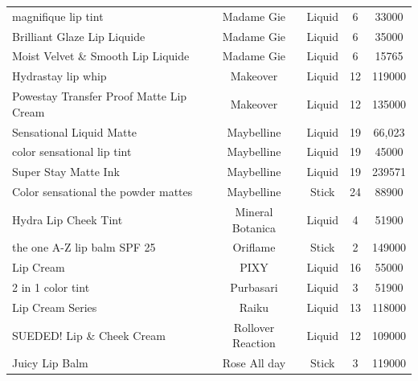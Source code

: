 \documentclass{article}
\begin{document}
\begin{longtable}{lcccc}
    magnifique lip tint                     & Madame Gie        & Liquid                       & 6               & 33000          \\
    Brilliant Glaze Lip Liquide             & Madame Gie        & Liquid                       & 6               & 35000          \\
    Moist Velvet \& Smooth Lip Liquide      & Madame Gie        & Liquid                       & 6               & 15765          \\
    Hydrastay lip whip                      & Makeover          & Liquid                       & 12              & 119000         \\
    Powestay Transfer Proof Matte Lip Cream & Makeover          & Liquid                       & 12              & 135000         \\
    Sensational Liquid Matte                & Maybelline        & Liquid                       & 19              & 66,023         \\
    color sensational lip tint              & Maybelline        & Liquid                       & 19              & 45000          \\
    Super Stay Matte Ink                    & Maybelline        & Liquid                       & 19              & 239571         \\
    Color sensational the powder mattes     & Maybelline        & Stick                        & 24              & 88900          \\
    Hydra Lip Cheek Tint                    & Mineral Botanica  & Liquid                       & 4               & 51900          \\
    the one A-Z lip balm SPF 25             & Oriflame          & Stick                        & 2               & 149000         \\
    Lip Cream                               & PIXY              & Liquid                       & 16              & 55000          \\
    2 in 1 color tint                       & Purbasari         & Liquid                       & 3               & 51900          \\
    Lip Cream Series                        & Raiku             & Liquid                       & 13              & 118000         \\
    SUEDED! Lip \& Cheek Cream              & Rollover Reaction & Liquid                       & 12              & 109000         \\
    Juicy Lip Balm                          & Rose All day      & Stick                        & 3               & 119000         \\

\end{longtable}
\end{document}
